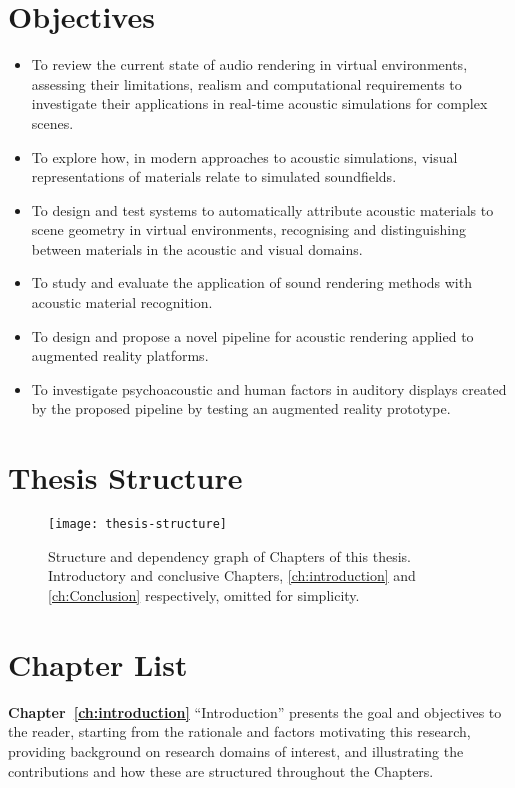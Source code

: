 \section{Objectives}\label{sec:thesis-objectives}
\begin{itemize}
    \item To review the current state of audio rendering in virtual environments, assessing their limitations, realism and computational requirements to  investigate their applications in real-time acoustic simulations for complex scenes.
    \item To explore how, in modern approaches to acoustic simulations, visual representations of materials relate to simulated soundfields.
    \item To design and test systems to automatically attribute acoustic materials to scene geometry in virtual environments, recognising and distinguishing between materials in the acoustic and visual domains.
    \item To study and evaluate the application of sound rendering methods with acoustic material recognition.
    \item To design and propose a novel pipeline for acoustic rendering applied to augmented reality platforms.
    \item To investigate psychoacoustic and human factors in auditory displays created by the proposed pipeline by testing an augmented reality prototype.
\end{itemize}

\section{Thesis Structure}

\begin{figure}[htbp]
    \centering
    \texttt{[image: thesis-structure]}
    \caption{Structure and dependency graph of Chapters of this thesis. Introductory and conclusive Chapters, \ref{ch:introduction} and \ref{ch:Conclusion} respectively, omitted for simplicity.}
    \label{fig:thesis-structure}
\end{figure}

\section{Chapter List}
\textbf{Chapter~\ref{ch:introduction}} ``Introduction'' presents the goal and objectives to the reader, starting from the rationale and factors motivating this research, providing background on research domains of interest, and illustrating the contributions and how these are structured throughout the Chapters.

